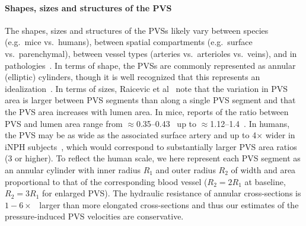 \paragraph{Shapes, sizes and structures of the PVS}
The shapes, sizes and structures of the PVSs likely vary between
species (e.g.~mice vs.~humans), between spatial compartments
(e.g.~surface vs.~parenchymal), between vessel types (arteries
vs.~arterioles vs.~veins), and in
pathologies~\cite{ichimura1991distribution, foley2012realtime,
  schain2017cortical, mestre2018flow, bedussi2018paravascular,
  mestre2022periarteriolar, smets2024perivascular, raicevic2023sizes,
  vinje2021brain, eide2024functional}. In terms of shape, the PVSs are
commonly represented as annular (elliptic) cylinders, though it is
well recognized that this represents an
idealization~\cite{mestre2018flow, tithof2019hydraulic,
  vinje2021brain, raicevic2023sizes, boster2024hydraulic,
  smets2024perivascular}. In terms of sizes, Raicevic et
al~\cite{raicevic2023sizes} note that the variation in PVS area is
larger between PVS segments than along a single PVS segment and that
the PVS area increases with lumen area. In mice, reports of the ratio
between PVS and lumen area range from
$\approx$0.35--0.43~\cite{smets2024perivascular} up to
$\approx$1.12--1.4~\cite{raicevic2023sizes, mestre2018flow}. In
humans, the PVS may be as wide as the associated surface artery and up
to 4$\times$ wider in iNPH subjects~\cite{eide2024functional}, which
would correspond to substantially larger PVS area ratios (3 or
higher). To reflect the human scale, we here represent each PVS
segment as an annular cylinder with inner radius $R_1$ and outer
radius $R_2$ of width and area proportional to that of the
corresponding blood vessel ($R_2 = 2 R_1$ at baseline, $R_2 = 3 R_1$
for enlarged PVS). The hydraulic resistance of annular cross-sections
is $1-6 \times$~\cite{tithof2019hydraulic} larger than more elongated
cross-sections and thus our estimates of the pressure-induced PVS
velocities are conservative.
